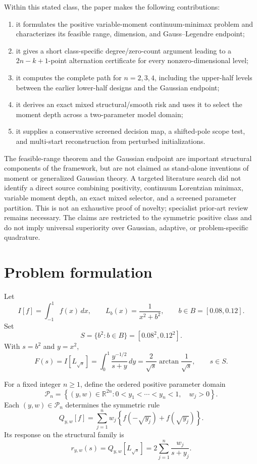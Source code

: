 \documentclass[preprint,12pt]{elsarticle}
\theoremstyle{remark}
\begin{document}
Within this stated class, the paper makes the following contributions:
\begin{enumerate}[label=(\roman*)]
\item it formulates the positive variable-moment continuum-minimax
problem and characterizes its feasible range, dimension, and
Gauss--Legendre endpoint;
\item it gives a short class-specific degree/zero-count argument leading
to a \(2n-k+1\)-point alternation certificate for every
nonzero-dimensional level;
\item it computes the complete path for \(n=2,3,4\), including the
upper-half levels between the earlier lower-half designs and the
Gaussian endpoint;
\item it derives an exact mixed structural/smooth risk and uses it to
select the moment depth across a two-parameter model domain;
\item it supplies a conservative screened decision map, a shifted-pole
scope test, and multi-start reconstruction from perturbed initializations.
\end{enumerate}

The feasible-range theorem and the Gaussian endpoint are important
structural components of the framework, but are not claimed as
stand-alone inventions of moment or generalized Gaussian theory. A
targeted literature search did not identify a direct source combining
positivity, continuum Lorentzian minimax, variable moment depth, an exact
mixed selector, and a screened parameter partition. This is not an
exhaustive proof of novelty; specialist prior-art review remains
necessary. The claims are restricted to the symmetric positive class
and do not imply universal superiority over Gaussian, adaptive, or
problem-specific quadrature.

\section{Problem formulation}

Let
\[
I[f]=\int_{-1}^{1} f(x)\,dx,
\qquad
L_b(x)=\frac{1}{x^2+b^2},
\qquad
b\in B=[0.08,0.12].
\]
Set
\[
S=\{b^2:b\in B\}=[0.08^2,0.12^2].
\]
With \(s=b^2\) and \(y=x^2\),
\[
F(s)=I[L_{\sqrt{s}}]
=\int_0^1\frac{y^{-1/2}}{s+y}\,dy
=\frac{2}{\sqrt{s}}\arctan\frac{1}{\sqrt{s}},
\qquad s\in S.
\]

For a fixed integer \(n\geq1\), define the ordered positive parameter
domain
\[
\mathcal P_n
=
\left\{
(y,w)\in\mathbb R^{2n}:
0<y_1<\cdots<y_n<1,\quad w_j>0
\right\}.
\]
Each \((y,w)\in\mathcal P_n\) determines the symmetric rule
\[
Q_{y,w}[f]
=
\sum_{j=1}^{n}w_j
\left\{
f(-\sqrt{y_j})+f(\sqrt{y_j})
\right\}.
\]
Its response on the structural family is
\[
r_{y,w}(s)
=
Q_{y,w}[L_{\sqrt{s}}]
=
2\sum_{j=1}^{n}\frac{w_j}{s+y_j}.
\]
\end{document}
